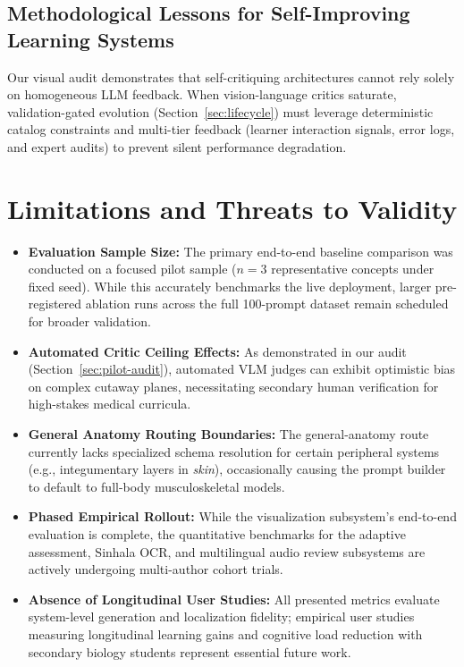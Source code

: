 \documentclass[conference]{IEEEtran}
\begin{document}
\subsection{Methodological Lessons for Self-Improving Learning Systems}
Our visual audit demonstrates that self-critiquing architectures cannot rely solely on homogeneous LLM feedback. When vision-language critics saturate, validation-gated evolution (Section~\ref{sec:lifecycle}) must leverage deterministic catalog constraints and multi-tier feedback (learner interaction signals, error logs, and expert audits) to prevent silent performance degradation.

\section{Limitations and Threats to Validity}
\label{sec:limitations}

\begin{itemize}
\item \textbf{Evaluation Sample Size:} The primary end-to-end baseline comparison was conducted on a focused pilot sample ($n=3$ representative concepts under fixed seed). While this accurately benchmarks the live deployment, larger pre-registered ablation runs across the full 100-prompt dataset remain scheduled for broader validation.
\item \textbf{Automated Critic Ceiling Effects:} As demonstrated in our audit (Section~\ref{sec:pilot-audit}), automated VLM judges can exhibit optimistic bias on complex cutaway planes, necessitating secondary human verification for high-stakes medical curricula.
\item \textbf{General Anatomy Routing Boundaries:} The general-anatomy route currently lacks specialized schema resolution for certain peripheral systems (e.g., integumentary layers in \textit{skin}), occasionally causing the prompt builder to default to full-body musculoskeletal models.
\item \textbf{Phased Empirical Rollout:} While the visualization subsystem's end-to-end evaluation is complete, the quantitative benchmarks for the adaptive assessment, Sinhala OCR, and multilingual audio review subsystems are actively undergoing multi-author cohort trials.
\item \textbf{Absence of Longitudinal User Studies:} All presented metrics evaluate system-level generation and localization fidelity; empirical user studies measuring longitudinal learning gains and cognitive load reduction with secondary biology students represent essential future work.
\end{itemize}
\end{document}

